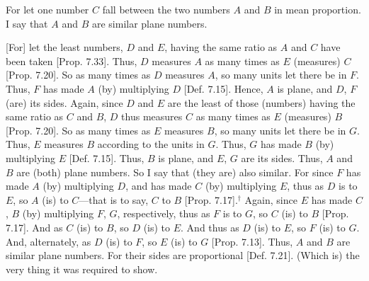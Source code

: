\begin{Parallel}{}{}
{For let one number $C$ fall  between the two numbers $A$
and $B$ in mean proportion. I say that $A$ and $B$ are similar plane numbers.

\epsfysize=1in
\centerline{}

\mbox{[}For] let the least numbers, $D$ and $E$,  having the same ratio as $A$ and $C$ have been taken [Prop. 7.33]. Thus,
$D$ measures $A$ as many  times as  $E$ (measures) $C$
[Prop. 7.20]. So as many times as $D$ measures $A$, so many units let there be in $F$. Thus, $F$ has made $A$ (by)
multiplying $D$ [Def. 7.15]. Hence, $A$ is 
plane, and $D$, $F$ (are) its sides. Again, since $D$ and $E$
are the least of those (numbers) having  the same ratio as $C$ and $B$, 
$D$ thus measures $C$ as many times as $E$ (measures) $B$ [Prop. 7.20]. So as many times as $E$ measures
$B$, so many units let there be in $G$. Thus, $E$ measures $B$ according to
the units in $G$. Thus, $G$ has made $B$ (by) multiplying $E$ [Def. 7.15]. Thus, $B$ is plane, and $E$, $G$ are its sides. Thus, $A$ and $B$ are (both) plane numbers. So I say that
(they are) also similar. For since $F$ has made $A$ (by) multiplying $D$,
and has made $C$ (by) multiplying $E$, thus as $D$ is to $E$, so $A$ (is) to $C$---that is to say, $C$ to $B$ [Prop. 7.17].$^\dag$ Again, since $E$ has made  $C$, $B$ (by)
multiplying  $F$, $G$, respectively, thus as $F$ is to $G$, so $C$ (is) to
$B$ [Prop. 7.17]. And as $C$ (is) to $B$, so
$D$ (is) to $E$. And thus as $D$ (is) to $E$, so $F$ (is) to $G$. And,
alternately, as $D$ (is) to $F$, so $E$ (is) to $G$ [Prop. 7.13]. Thus, $A$ and $B$ are similar plane
numbers. For their sides are proportional [Def. 7.21].
(Which is) the very thing it was required to show.}
\end{Parallel}


\vspace{7pt}{\footnotesize\noindent$^\dag$ This part of the proof is defective, since it is not demonstrated that $F\times E = C$. Furthermore, it is
not necessary to show that $D:E::A:C$, because this
is true by hypothesis.}

